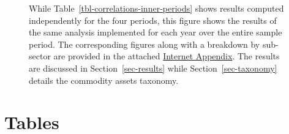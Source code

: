 \documentclass[
  authoryear,
  preprint,
  3p]{elsarticle}
\begin{document}
\newpage


\begin{figure}


\caption{\label{fig-correlations}While
Table~\ref{tbl-correlations-inner-periods} shows results computed
independently for the four periods, this figure shows the results of the
same analysis implemented for each year over the entire sample period.
The corresponding figures along with a breakdown by sub-sector are
provided in the attached
\href{https://bautheac.shinyapps.io/co-movement/}{Internet Appendix}.
The results are discussed in Section~\ref{sec-results} while
Section~\ref{sec-taxonomy} details the commodity assets taxonomy.}

\end{figure}%

\restoregeometry

\newpage

\section*{Tables}\label{tables}

\begingroup\fontsize{7}{9}\selectfont
\end{document}
